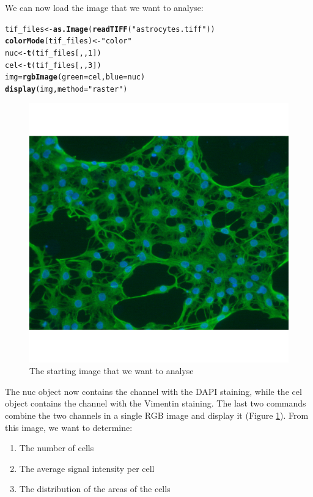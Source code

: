 \documentclass{article}\usepackage[]{graphicx}\usepackage[]{color}
\makeatletter
\def\maxwidth{ %
  \ifdim\Gin@nat@width>\linewidth
    \linewidth
  \else
    \Gin@nat@width
  \fi
}
\newcommand{\hlnum}[1]{\textcolor[rgb]{0.686,0.059,0.569}{#1}}%
\newcommand{\hlstr}[1]{\textcolor[rgb]{0.192,0.494,0.8}{#1}}%
\newcommand{\hlstd}[1]{\textcolor[rgb]{0.345,0.345,0.345}{#1}}%
\newcommand{\hlkwb}[1]{\textcolor[rgb]{0.69,0.353,0.396}{#1}}%
\newcommand{\hlkwc}[1]{\textcolor[rgb]{0.333,0.667,0.333}{#1}}%
\newcommand{\hlkwd}[1]{\textcolor[rgb]{0.737,0.353,0.396}{\textbf{#1}}}%
\newenvironment{kframe}{%
 \def\at@end@of@kframe{}%
 \ifinner\ifhmode%
  \def\at@end@of@kframe{\end{minipage}}%
  \begin{minipage}{\columnwidth}%
 \fi\fi%
 \def\FrameCommand##1{\hskip\@totalleftmargin \hskip-\fboxsep
 \colorbox{shadecolor}{##1}\hskip-\fboxsep
     \hskip-\linewidth \hskip-\@totalleftmargin \hskip\columnwidth}%
 \MakeFramed {\advance\hsize-\width
   \@totalleftmargin\z@ \linewidth\hsize
   \@setminipage}}%
 {\par\unskip\endMakeFramed%
 \at@end@of@kframe}
\newenvironment{knitrout}{}{} %
\makeatother
\begin{document}
We can now load the image that we want to analyse:
\begin{knitrout}
\color{fgcolor}\begin{kframe}
\begin{alltt}
\hlstd{tif_files} \hlkwb{<-} \hlkwd{as.Image}\hlstd{(}\hlkwd{readTIFF}\hlstd{(}\hlstr{"astrocytes.tiff"}\hlstd{))}
\hlkwd{colorMode}\hlstd{(tif_files)} \hlkwb{<-} \hlstr{"color"}
\hlstd{nuc} \hlkwb{<-} \hlkwd{t}\hlstd{(tif_files[,,}\hlnum{1}\hlstd{])}
\hlstd{cel} \hlkwb{<-} \hlkwd{t}\hlstd{(tif_files[,,}\hlnum{3}\hlstd{])}
\hlstd{img} \hlkwb{=} \hlkwd{rgbImage}\hlstd{(}\hlkwc{green}\hlstd{=cel,} \hlkwc{blue}\hlstd{=nuc)}
\hlkwd{display}\hlstd{(img,} \hlkwc{method}\hlstd{=}\hlstr{"raster"}\hlstd{)}
\end{alltt}
\end{kframe}\begin{figure}

{\centering \includegraphics[width=\maxwidth]{knit_figure/figfull_image-1} 

}

\caption[The starting image that we want to analyse]{The starting image that we want to analyse}\label{fig:full.image}
\end{figure}


\end{knitrout}
The nuc object now contains the channel with the DAPI staining, while the cel object contains the channel with the Vimentin staining.
The last two commands combine the two channels in a single RGB image and display it (Figure \ref{fig:full.image}). From this image, we want to determine:
\begin{enumerate}
  \item The number of cells
  \item The average signal intensity per cell
  \item The distribution of the areas of the cells
\end{enumerate}
\end{document}
